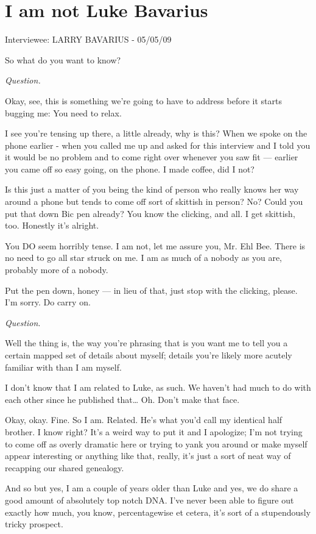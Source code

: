 \chapter{I am {\bf not} Luke Bavarius}


Interviewee: LARRY BAVARIUS - 05/05/09


So what do you want to know?


{\em Question.}


Okay, see, this is something we're going to have to address
before it starts bugging me: You need to relax.

I see you're tensing up there, a little already, why is this?
When we spoke on the phone earlier - when you called me up and
asked for this interview and I told you it would be no problem and
to come right over whenever you saw fit --- earlier you came
off so easy going, on the phone. I made coffee, did I not?

Is this just a matter of you being the kind of person who really
knows her way around a phone but tends to come off sort of skittish
in person? No? Could you put that down Bic pen already? You know
the clicking, and all. I get skittish, too. Honestly it's
alright.

You DO seem horribly tense. I am not, let me assure you, Mr. Ehl
Bee. There is no need to go all star struck on me. I am as much of
a nobody as you are, probably more of a nobody.

Put the pen down, honey --- in lieu of that, just stop with the
clicking, please. I'm sorry. Do carry on.



{\em Question}.



Well the thing is, the way you're phrasing that is you want
me to tell you a certain mapped set of details about myself;
details you're likely more acutely familiar with than I am
myself.

I don't know that I am related to Luke, as such. We
haven't had much to do with each other since he published
that{\ldots} Oh. Don't make that face.

Okay, okay. Fine. So I am. Related. He's what you'd
call my identical half brother. I know right? It's a weird
way to put it and I apologize; I'm not trying to come off as
overly dramatic here or trying to yank you around or make myself
appear interesting or anything like that, really, it's just a
sort of neat way of recapping our shared genealogy.

And so but yes, I am a couple of years older than Luke and yes, we
do share a good amount of absolutely top notch DNA. I've
never been able to figure out exactly how much, you know,
percentagewise et cetera, it's sort of a stupendously tricky
prospect.



